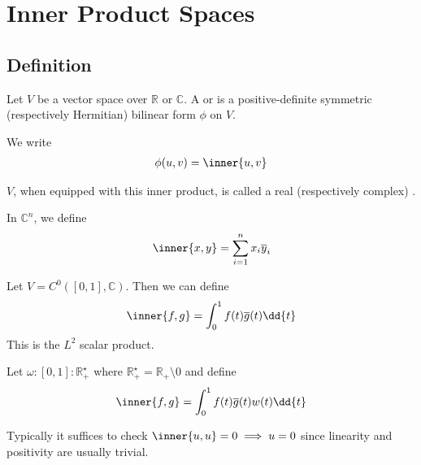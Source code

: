 \section{Inner Product Spaces}

\subsection{Definition}
\begin{definition}
	Let $V$ be a vector space over $\mathbb R$ or $\mathbb C$.
	A  or  is a positive-definite symmetric (respectively Hermitian) bilinear form $\phi$ on $V$.
\end{definition}

\begin{notation}
	We write
	\begin{align*}
		\phi(u,v) = \inner{u,v}
	\end{align*}
\end{notation} 

\begin{definition}
	$V$, when equipped with this inner product, is called a real (respectively complex) .
\end{definition} 

\begin{example}
	In $\mathbb C^n$, we define
	\begin{align*}
		\inner{x,y} = \sum_{i=1}^n x_i \overline y_i
	\end{align*}
\end{example}

\begin{example}
	Let $V = C^0([0,1], \mathbb C)$.
	Then we can define
	\begin{align*}
		\inner{f,g} = \int_0^1 f(t) \overline g(t) \dd{t}
	\end{align*}
	This is the $L^2$ scalar product.
\end{example}

\begin{example}
	Let $\omega \colon [0,1] \colon \mathbb R^\star_+$ where $\mathbb R^\star_+ = \mathbb R_+ \setminus \qty{0}$ and define
	\begin{align*}
		\inner{f,g} = \int_0^1 f(t) \overline g(t) w(t) \dd{t}
	\end{align*}
\end{example}

\begin{remark}
	Typically it suffices to check $\inner{u,u} = 0 \implies u = 0$ since linearity and positivity are usually trivial.
\end{remark}

